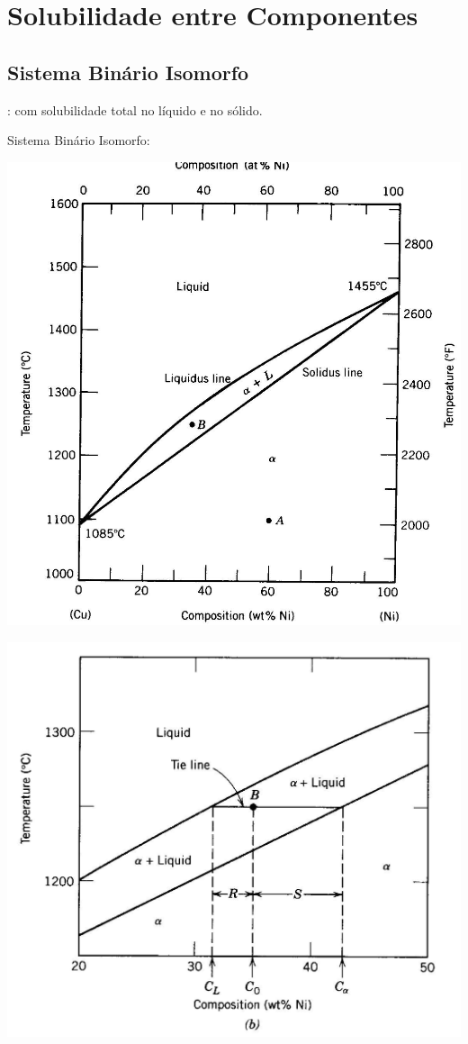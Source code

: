 \section{Solubilidade entre Componentes}

\subsection{ Sistema Binário Isomorfo}
 
 : com solubilidade total no líquido e no sólido.




Sistema Binário Isomorfo:

\includegraphics[scale=0.4,trim={0 0 0 0}]{figures/binIso}

\includegraphics[scale=0.4,trim={0 0 0 0}]{figures/binIso2}

